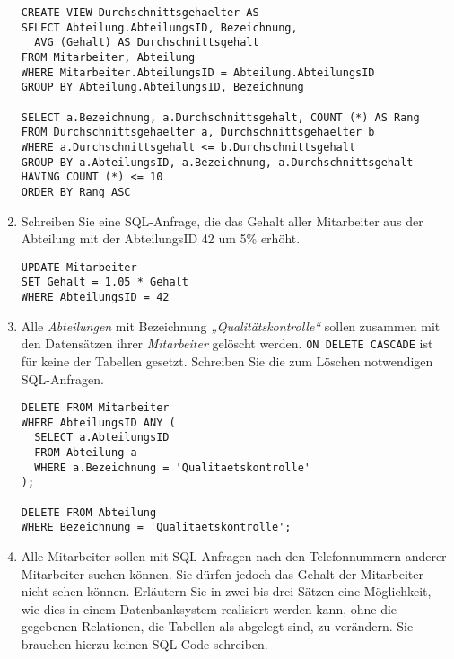 \documentclass{lehramt-informatik-minimal}
\begin{document}
\begin{enumerate}
\begin{antwort}
\begin{verbatim}
CREATE VIEW Durchschnittsgehaelter AS
SELECT Abteilung.AbteilungsID, Bezeichnung,
  AVG (Gehalt) AS Durchschnittsgehalt
FROM Mitarbeiter, Abteilung
WHERE Mitarbeiter.AbteilungsID = Abteilung.AbteilungsID
GROUP BY Abteilung.AbteilungsID, Bezeichnung

SELECT a.Bezeichnung, a.Durchschnittsgehalt, COUNT (*) AS Rang
FROM Durchschnittsgehaelter a, Durchschnittsgehaelter b
WHERE a.Durchschnittsgehalt <= b.Durchschnittsgehalt
GROUP BY a.AbteilungsID, a.Bezeichnung, a.Durchschnittsgehalt
HAVING COUNT (*) <= 10
ORDER BY Rang ASC
\end{verbatim}
\end{antwort}


\item Schreiben Sie eine SQL-Anfrage, die das Gehalt aller Mitarbeiter
aus der Abteilung mit der AbteilungsID 42 um 5\% erhöht.

\begin{antwort}
\begin{verbatim}
UPDATE Mitarbeiter
SET Gehalt = 1.05 * Gehalt
WHERE AbteilungsID = 42
\end{verbatim}
\end{antwort}


\item Alle \emph{Abteilungen} mit Bezeichnung
\emph{„Qualitätskontrolle“} sollen zusammen mit den Datensätzen ihrer
\emph{Mitarbeiter} gelöscht
werden. \verb|ON DELETE CASCADE| ist für keine der Tabellen gesetzt.
Schreiben Sie die zum Löschen notwendigen SQL-Anfragen.

\begin{antwort}
\begin{verbatim}
DELETE FROM Mitarbeiter
WHERE AbteilungsID ANY (
  SELECT a.AbteilungsID
  FROM Abteilung a
  WHERE a.Bezeichnung = 'Qualitaetskontrolle'
);

DELETE FROM Abteilung
WHERE Bezeichnung = 'Qualitaetskontrolle';
\end{verbatim}
\end{antwort}


\item Alle Mitarbeiter sollen mit SQL-Anfragen nach den Telefonnummern
anderer Mitarbeiter suchen können. Sie dürfen jedoch das Gehalt der
Mitarbeiter nicht sehen können. Erläutern Sie in zwei bis drei Sätzen
eine Möglichkeit, wie dies in einem Datenbanksystem realisiert werden
kann, ohne die gegebenen Relationen, die Tabellen als abgelegt sind, zu
verändern. Sie brauchen hierzu keinen SQL-Code schreiben.


\end{enumerate}
\end{document}

